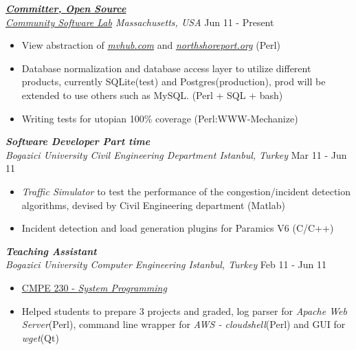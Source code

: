\documentclass[line, margin]{res}
\begin{document}
\begin{resume}
	{\sl \textbf{\href{https://launchpad.net/mvhub}{Committer, Open Source}} \\ \href{http://thecsl.org/}{Community Software Lab} Massachusetts, USA} \hfill Jun 11 - Present \\
	\vspace{-0.3cm}
	\begin{itemize} \itemsep -2pt
		\item View abstraction of \textit{\href{http://mvhub.com/}{mvhub.com}} and \textit{\href{http://northshoreport.org/}{northshoreport.org}} (Perl)
		\item Database normalization and database access layer to utilize different products, currently SQLite(test) and Postgres(production), prod will be extended to use others such as MySQL. (Perl + SQL + bash)
		\item Writing tests for utopian 100\% coverage (Perl:WWW-Mechanize)
	\end{itemize}

	{\sl \textbf{Software Developer Part time} \\ Bogazici University Civil Engineering Department Istanbul, Turkey} \hfill Mar 11 - Jun 11 \\
	\vspace{-0.3cm}
	\begin{itemize} \itemsep -2pt
		\item \textit{Traffic Simulator} to test the performance of the congestion/incident detection algorithms, devised by Civil Engineering department (Matlab)
		\item Incident detection and load generation plugins for Paramics V6 (C/C++)
	\end{itemize}

	{\sl \textbf{Teaching Assistant} \\ Bogazici University Computer Engineering Istanbul, Turkey} \hfill Feb 11 - Jun 11 \\
	\vspace{-.3cm} 
	\begin{itemize} \itemsep -2pt
		\item \href{http://www.cmpe.boun.edu.tr/courses/?cmpe=230}{CMPE 230 - \textit{System Programming}}
		\item Helped students to prepare 3 projects and graded, log parser for \textit{Apache Web Server}(Perl), command line wrapper for \textit{AWS - cloudshell}(Perl) and GUI for \textit{wget}(Qt)
	\end{itemize}


\end{resume}
\end{document}
